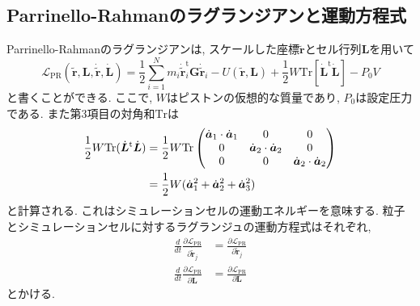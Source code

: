\subsection{Parrinello-Rahmanのラグランジアンと運動方程式}
Parrinello-Rahmanのラグランジアンは, スケールした座標$\tilde{\bm{r}}$とセル行列$\bm{L}$を用いて
\begin{equation}
  \mathcal{L}_{\mathrm{PR}}
  (\tilde{\bm{r}}, \bm{L}, \dot{\tilde{\bm{r}}}, \dot{\bm{L}})
  =
  \frac{1}{2}
  \sum_{i=1}^{N}
  m_{i} \dot{\tilde{\bm{r}}}_{i}^{\mathrm{t}} \bm{G} \dot{\tilde{\bm{r}}}_{i}
  -
  U(\tilde{\bm{r}}, \bm{L})
  +
  \frac{1}{2} W
  \mathrm{Tr} [\dot{\bm{L}}^{\mathrm{t}} \dot{\bm{L}}]
  -
  P_{0}V
\end{equation}
と書くことができる.
ここで, $W$はピストンの仮想的な質量であり, $P_{0}$は設定圧力である.
また第3項目の対角和$\mathrm{Tr}$は
\begin{align}
  \frac{1}{2} W \mathrm{Tr} (\dot{\bm{L}}^{\mathrm{t}} \dot{\bm{L}})
  &=
  \frac{1}{2} W
  \mathrm{Tr}
  \begin{pmatrix}
    \dot{\bm{a}}_{1} \cdot \dot{\bm{a}}_{1} & 0 & 0 \\
    0 & \dot{\bm{a}}_{2} \cdot \dot{\bm{a}}_{2} & 0 \\
    0 & 0 & \dot{\bm{a}}_{2} \cdot \dot{\bm{a}}_{2} \\
  \end{pmatrix}
  \notag \\
  &=
  \frac{1}{2} W
  (\dot{\bm{a}}_{1}^{2} + \dot{\bm{a}}_{2}^{2} + \dot{\bm{a}}_{3}^{2})
\end{align}
と計算される. これはシミュレーションセルの運動エネルギーを意味する.
粒子とシミュレーションセルに対するラグランジュの運動方程式はそれぞれ, 
\begin{align}
  \frac{d}{dt}
  \frac{\partial \mathcal{L}_{\mathrm{PR}}}{\partial \dot{\tilde{\bm{r}}}_{j}}
  &=
  \frac{\partial \mathcal{L}_{\mathrm{PR}}}{\partial \tilde{\bm{r}}_{j}}
  \label{Eq:EoM-Lagrange-PR-particle1}
  \\
  \frac{d}{dt}
  \frac{\partial \mathcal{L}_{\mathrm{PR}}}{\partial \dot{\bm{L}}}
  &=
  \frac{\partial \mathcal{L}_{\mathrm{PR}}}{\partial \bm{L}}
  \label{Eq:EoM-Lagrange-PR-cell1}
\end{align}
とかける.

